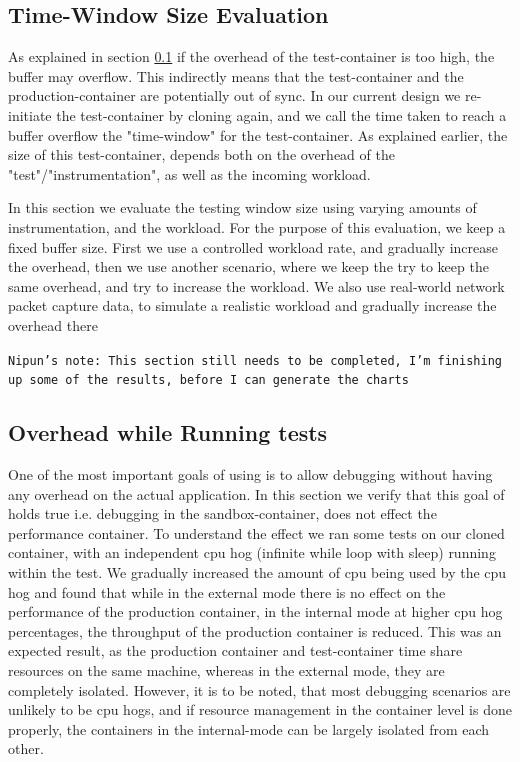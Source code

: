 \subsection{Time-Window Size Evaluation}
\label{sec:timewindowPerformance}

As explained in section \ref{sec:timewindowPerformance} if the overhead of the test-container is too high, the buffer may overflow.
This indirectly means that the test-container and the production-container are potentially out of sync.
In our current design we re-initiate the test-container by cloning again, and we call the time taken to reach a buffer overflow the "time-window" for the test-container.
As explained earlier, the size of this test-container, depends both on the overhead of the "test"/"instrumentation", as well as the incoming workload.

In this section we evaluate the testing window size using varying amounts of instrumentation, and the workload.
For the purpose of this evaluation, we keep a fixed buffer size. 
First we use a controlled workload rate, and gradually increase the overhead, then we use another scenario, where we keep the try to keep the same overhead, and try to increase the workload.
We also use real-world network packet capture data, to simulate a realistic workload and gradually increase the overhead there

\texttt{Nipun's note: This section still needs to be completed, I'm finishing up some of the results, before I can generate the charts}

\subsection{Overhead while Running tests}
\label{sec:overhead}

One of the most important goals of using \parikshan is to allow debugging without having any overhead on the actual application.
In this section we verify that this goal of \parikshan holds true i.e. debugging in the sandbox-container, does not effect the performance container. 
To understand the effect we ran some tests on our cloned container, with an independent cpu hog (infinite while loop with sleep) running within the test.
We gradually increased the amount of cpu being used by the cpu hog and found that while in the external mode there is no effect on the performance of the production container, in the internal mode at higher cpu hog percentages, the throughput of the production container is reduced.
This was an expected result, as the production container and test-container time share resources on the same machine, whereas in the external mode, they are completely isolated.
However, it is to be noted, that most debugging scenarios are unlikely to be cpu hogs, and if resource management in the container level is done properly, the containers in the internal-mode can be largely isolated from each other.